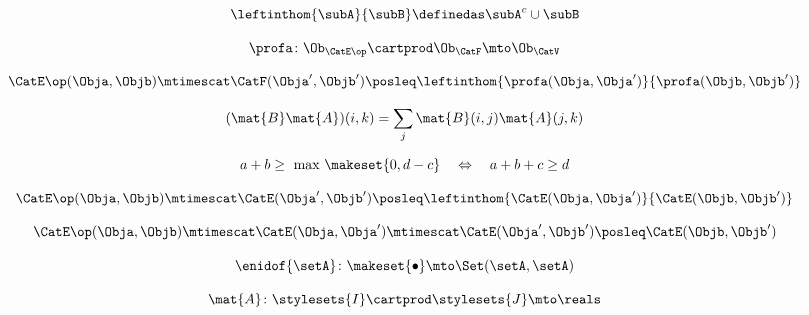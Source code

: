 {\begin{forslides}
    \begin{equation}
        \label{eq:slides_enrichment_65}
        \leftinthom{\subA}{\subB} \definedas \subA^{c} \cup \subB
    \end{equation}

    \begin{equation}
        \label{eq:slides_enrichment_66}
        \profa \colon \Ob_{\CatE\op} \cartprod \Ob_{\CatF} \mto \Ob_\CatV
    \end{equation}

    \begin{equation}
        \label{eq:slides_enrichment_67}
        \CatE\op(\Obja, \Objb) \mtimescat \CatF(\Obja', \Objb') \posleq \leftinthom{\profa(\Obja, \Obja')}{\profa(\Objb, \Objb')}
    \end{equation}

    \begin{equation}
        \label{eq:slides_enrichment_68}
        (\mat{B} \mat{A})(i, k) = \sum_{j} \mat{B}(i,j) \mat{A}(j,k)
    \end{equation}

    \begin{equation}
        \label{eq:slides_enrichment_69}
        a + b \geq \text{ max } \makeset{0, d - c} \quad \Leftrightarrow \quad a + b + c \geq d
    \end{equation}

    \begin{equation}
        \label{eq:slides_enrichment_70}
        \CatE\op(\Obja, \Objb) \mtimescat \CatE(\Obja', \Objb') \posleq \leftinthom{\CatE(\Obja, \Obja')}{\CatE(\Objb, \Objb')}
    \end{equation}

    \begin{equation}
        \label{eq:slides_enrichment_71}
        \CatE\op(\Obja, \Objb) \mtimescat \CatE(\Obja, \Obja') \mtimescat \CatE(\Obja', \Objb') \posleq \CatE(\Objb, \Objb')
    \end{equation}

    \begin{equation}
        \label{eq:slides_enrichment_72}
        \enidof{\setA} \colon \makeset{ \bullet } \mto \Set(\setA, \setA)
    \end{equation}

    \begin{equation}
        \label{eq:slides_enrichment_73}
        \mat{A} \colon \stylesets{I} \cartprod \stylesets{J} \mto \reals
    \end{equation}


\end{forslides}}
